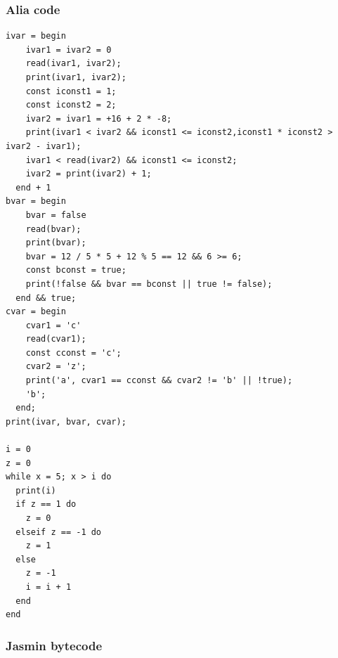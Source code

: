 \documentclass[paper=a4, fontsize=11pt]{article}
\numberwithin{equation}{section}		%
\numberwithin{figure}{section}			%
\numberwithin{table}{section}				%
\begin{document}
\subsubsection{Alia code}
\begin{lstlisting}[style=muchcode]
ivar = begin
    ivar1 = ivar2 = 0
    read(ivar1, ivar2);
    print(ivar1, ivar2);
    const iconst1 = 1;
    const iconst2 = 2;
    ivar2 = ivar1 = +16 + 2 * -8;
    print(ivar1 < ivar2 && iconst1 <= iconst2,iconst1 * iconst2 > ivar2 - ivar1);
    ivar1 < read(ivar2) && iconst1 <= iconst2;
    ivar2 = print(ivar2) + 1;
  end + 1
bvar = begin
    bvar = false
    read(bvar);
    print(bvar);
    bvar = 12 / 5 * 5 + 12 % 5 == 12 && 6 >= 6;
    const bconst = true;
    print(!false && bvar == bconst || true != false);
  end && true;
cvar = begin
    cvar1 = 'c'
    read(cvar1);
    const cconst = 'c';
    cvar2 = 'z';
    print('a', cvar1 == cconst && cvar2 != 'b' || !true);
    'b';
  end;
print(ivar, bvar, cvar);

i = 0
z = 0
while x = 5; x > i do
  print(i)
  if z == 1 do
    z = 0
  elseif z == -1 do
    z = 1
  else
    z = -1
    i = i + 1
  end
end
\end{lstlisting}

\subsubsection{Jasmin bytecode}

\restoregeometry


% 
\end{document}
